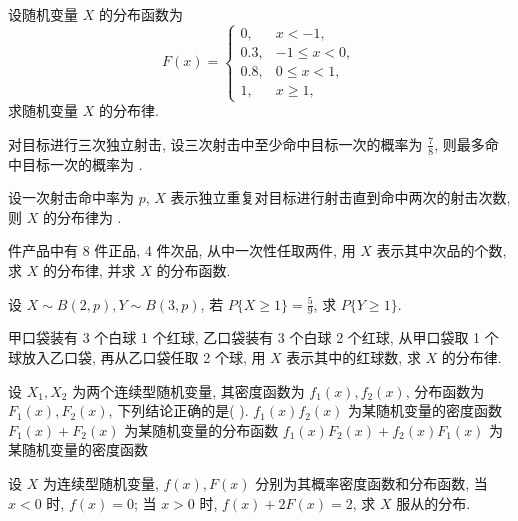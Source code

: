 \documentclass[padp]{ExBook}
\begin{document}
\begin{qitems}

    \begin{bbox}
        \qitem  设随机变量 $X$ 的分布函数为
$$ F(x) = 
\begin{cases}
0, & x < -1, \\
0.3, & -1 \le x < 0, \\
0.8, & 0 \le x < 1, \\
1, & x \ge 1,
\end{cases}
$$
求随机变量 $X$ 的分布律.
    \end{bbox}
    \begin{bbox}
        \qitem  对目标进行三次独立射击, 设三次射击中至少命中目标一次的概率为 $\frac{7}{8}$, 则最多命中目标一次的概率为 \blankline.
    \end{bbox}
    \begin{bbox}
        \qitem  设一次射击命中率为 $p$, $X$ 表示独立重复对目标进行射击直到命中两次的射击次数, 则 $X$ 的分布律为 \blankline.
    \end{bbox}
    \begin{bbox}
         件产品中有 8 件正品, 4 件次品, 从中一次性任取两件, 用 $X$ 表示其中次品的个数, 求 $X$ 的分布律, 并求 $X$ 的分布函数.
    \end{bbox}
    \begin{bbox}
        \qitem  设 $X \sim B(2, p), Y \sim B(3, p)$, 若 $P\{X \ge 1\} = \frac{5}{9}$, 求 $P\{Y \ge 1\}$.
    \end{bbox}
    \begin{bbox}
        \qitem  甲口袋装有 3 个白球 1 个红球, 乙口袋装有 3 个白球 2 个红球, 从甲口袋取 1 个球放入乙口袋, 再从乙口袋任取 2 个球, 用 $X$ 表示其中的红球数, 求 $X$ 的分布律.
    \end{bbox}
    \begin{bbox}
        \qitem  设 $X_1, X_2$ 为两个连续型随机变量, 其密度函数为 $f_1(x), f_2(x)$, 分布函数为 $F_1(x), F_2(x)$, 下列结论正确的是( \quad ).
        {$f_1(x)f_2(x)$ 为某随机变量的密度函数}
        {$F_1(x)+F_2(x)$ 为某随机变量的分布函数}
        {$f_1(x)F_2(x)+f_2(x)F_1(x)$ 为某随机变量的密度函数}
    \end{bbox}
    \begin{bbox}
        \qitem  设 $X$ 为连续型随机变量, $f(x), F(x)$ 分别为其概率密度函数和分布函数, 当 $x<0$ 时, $f(x)=0$; 当 $x>0$ 时, $f(x)+2F(x)=2$, 求 $X$ 服从的分布.
    \end{bbox}
    \begin{bbox}

\end{bbox}
\end{qitems}
\end{document}
